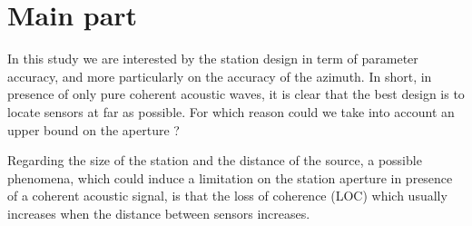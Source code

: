 \documentclass[a4paper, 12pt]{report}
\begin{document}
 \sloppy
 \tableofcontents



\chapter{Main part}

In this study we are interested by the station design in term of parameter accuracy, and more particularly on the accuracy of the azimuth. In short, in presence of only pure coherent acoustic waves, it is clear that the best design is to locate sensors at far as possible. For which reason could we take into account an upper bound on the aperture ? 

Regarding the size of the station and the distance of the source, a possible phenomena, which could induce a limitation on the station aperture in presence of a coherent acoustic signal, is that the loss of coherence (LOC) which usually increases when the distance between sensors increases.
\end{document}
